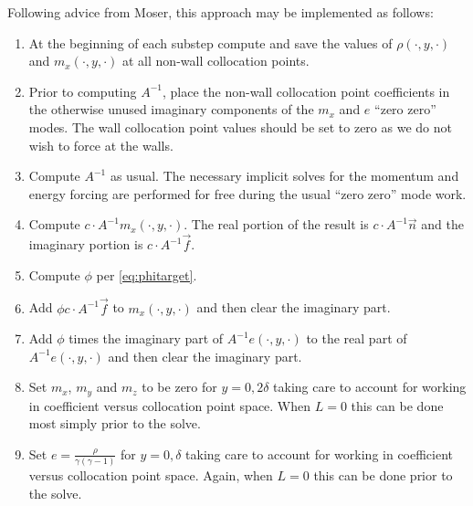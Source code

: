 \documentclass[letterpaper,11pt,nointlimits,reqno]{amsart}
\begin{document}
Following advice from Moser, this approach may be implemented as follows:
\begin{enumerate}
  \item At the beginning of each substep compute and save the values of
    $\rho\!\left(\cdot,y,\cdot\right)$ and $m_x\!\left(\cdot,y,\cdot\right)$
    at all non-wall collocation points.
  \item Prior to computing $A^{-1}$, place the non-wall collocation point
    coefficients in the otherwise unused imaginary components of the
    $m_x$ and $e$ ``zero zero'' modes.  The wall collocation point values
    should be set to zero as we do not wish to force at the walls.
  \item Compute $A^{-1}$ as usual.  The necessary implicit solves for the
    momentum and energy forcing are performed for free during the usual
    ``zero zero'' mode work.
  \item Compute $c\cdot{}A^{-1}m_x\!\left(\cdot,y,\cdot\right)$.
    The real portion of the result is $c\cdot{}A^{-1}\vec{n}$
    and the imaginary portion is $c\cdot{}A^{-1}\vec{f}$.
  \item Compute $\phi$ per \eqref{eq:phitarget}.
  \item Add $\phi{}c\cdot{}A^{-1}\vec{f}$ to $m_x\!\left(\cdot,y,\cdot\right)$
        and then clear the imaginary part.
  \item Add $\phi$ times the imaginary part of $A^{-1}e\!\left(\cdot,y,\cdot\right)$
        to the real part of $A^{-1}e\!\left(\cdot,y,\cdot\right)$
        and then clear the imaginary part.
  \item Set $m_x$, $m_y$ and $m_z$ to be zero for $y=0,2\delta$
        taking care to account for working in coefficient versus collocation
        point space.  When $L = 0$ this can be done most simply prior
        to the solve.
  \item Set $e = \frac{\rho}{\gamma\left(\gamma-1\right)}$ for $y = 0,\delta$
        taking care to account for working in coefficient versus collocation
        point space.  Again, when $L = 0$ this can be done prior to the
        solve.
\end{enumerate}



\end{document}
